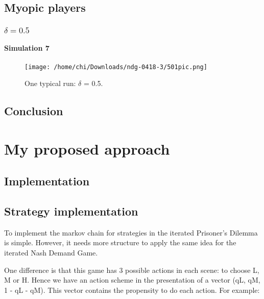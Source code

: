 \documentclass[12.5pt]{report}
\begin{document}
\section{Myopic players}

\subsection{$\delta = 0.5$}

\subsubsection{Simulation 7}

\begin{figure}
\center
\texttt{[image: /home/chi/Downloads/ndg-0418-3/501pic.png]}
\caption{One typical run: $\delta$ = 0.5.}
\end{figure}

\section{Conclusion}



















\chapter{My proposed approach}

\section{Implementation}
\section{Strategy implementation}

To implement the markov chain for strategies in the iterated Prisoner's Dilemma is simple. However, it needs more structure to apply the same idea for the iterated Nash Demand Game.

One difference is that this game has 3 possible actions in each scene: to choose L, M or H. Hence we have an action scheme in the presentation of a vector (qL, qM, 1 - qL - qM). This vector contains the propensity to do each action. For example:
\end{document}
